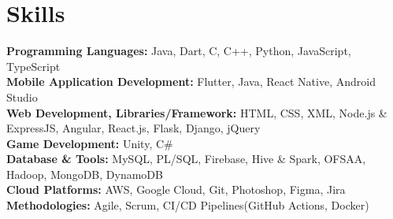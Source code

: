 \documentclass[10pt, legalpaper]{article}
\newenvironment{onecolentry}{
    \par\noindent
}{
    \par
}
\begin{document}
\section{Skills}
\begin{onecolentry}

\textbf{Programming Languages:} Java, Dart, C, C++, Python, JavaScript, TypeScript \\
\textbf{Mobile Application Development:} Flutter, Java, React Native, Android Studio \\
\textbf{Web Development, Libraries/Framework:} HTML, CSS, XML, Node.js \& ExpressJS, Angular, React.js, Flask, Django, jQuery \\
\textbf{Game Development:} Unity, C\# \\
\textbf{Database \& Tools:} MySQL, PL/SQL, Firebase, Hive \& Spark, OFSAA, Hadoop, MongoDB, DynamoDB \\
\textbf{Cloud Platforms:} AWS, Google Cloud, Git, Photoshop, Figma, Jira \\
\textbf{Methodologies:} Agile, Scrum, CI/CD Pipelines(GitHub Actions, Docker)

\end{onecolentry}

\end{document}
